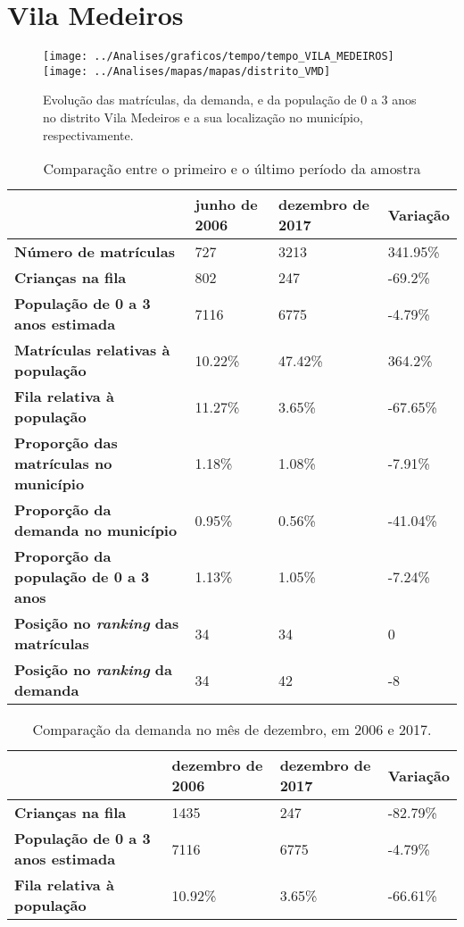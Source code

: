 \section{Vila Medeiros}
\begin{figure}[H]
\centering
\texttt{[image: ../Analises/graficos/tempo/tempo\_VILA\_MEDEIROS]}
\texttt{[image: ../Analises/mapas/mapas/distrito\_VMD]}
\caption{Evolução das matrículas, da demanda, e da população de 0 a 3 anos no distrito Vila Medeiros e a sua localização no município, respectivamente.}
\end{figure}
\begin{table}[H]
\begin{tabular}{l|l|l|l}
\textbf{}                                      & \textbf{junho de 2006}       & \textbf{dezembro de 2017}    & \textbf{Variação} \\ \hline
\textbf{Número de matrículas}                  & 727 & 3213 & 341.95\% \\ \hline
\textbf{Crianças na fila}                      & 802 & 247 & -69.2\% \\ \hline
\textbf{População de 0 a 3 anos estimada}      & 7116 & 6775 & -4.79\% \\ \hline
\textbf{Matrículas relativas à população}      & 10.22\% & 47.42\% & 364.2\% \\ \hline
\textbf{Fila relativa à população}             & 11.27\% & 3.65\% & -67.65\% \\ \hline
\textbf{Proporção das matrículas no município} & 1.18\% & 1.08\% & -7.91\% \\ \hline
\textbf{Proporção da demanda no município}     & 0.95\% & 0.56\% & -41.04\% \\ \hline
\textbf{Proporção da população de 0 a 3 anos}  & 1.13\% & 1.05\% & -7.24\% \\ \hline
\textbf{Posição no \textit{ranking} das matrículas}     & 34 & 34 & 0 \\ \hline
\textbf{Posição no \textit{ranking} da demanda}         & 34 & 42 & -8 \\ 
\end{tabular}
\caption{Comparação entre o primeiro e o último período da amostra}
\end{table}
\begin{table}[H]
\begin{tabular}{l|l|l|l}
\textbf{}                                 & \textbf{dezembro de 2006} & \textbf{dezembro de 2017} & \textbf{Variação} \\ \hline
\textbf{Crianças na fila}                      & 1435 & 247 & -82.79\% \\ \hline
\textbf{População de 0 a 3 anos estimada}      & 7116 & 6775 & -4.79\% \\ \hline
\textbf{Fila relativa à população}             & 10.92\% & 3.65\% & -66.61\% \\
\end{tabular}
\caption{Comparação da demanda no mês de dezembro, em 2006 e 2017.}
\end{table}
